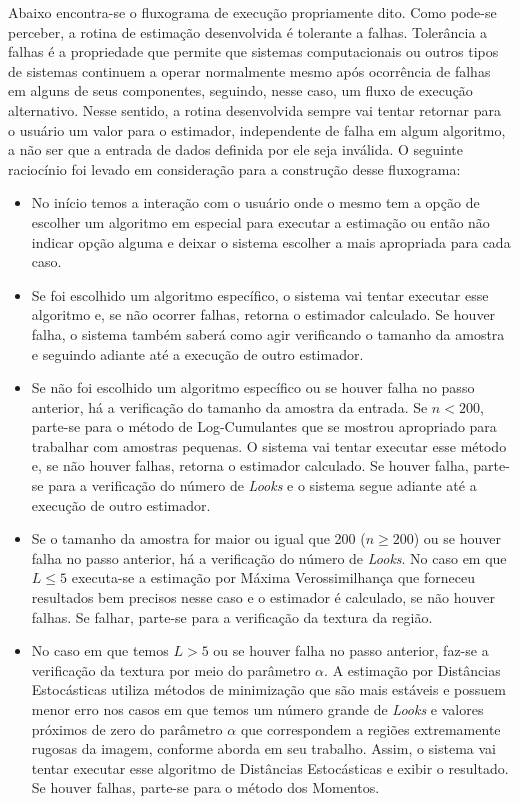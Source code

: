 Abaixo encontra-se o fluxograma de execução propriamente dito. Como pode-se perceber, a rotina de estimação desenvolvida é tolerante a falhas. Tolerância a falhas é a propriedade que permite que sistemas computacionais ou outros tipos de sistemas continuem a operar normalmente mesmo após ocorrência de falhas em alguns de seus componentes, seguindo, nesse caso, um fluxo de execução alternativo. Nesse sentido, a rotina desenvolvida sempre vai tentar retornar para o usuário um valor para o estimador, independente de falha em algum algoritmo, a não ser que a entrada de dados definida por ele seja inválida. O seguinte raciocínio foi levado em consideração para a construção desse fluxograma:
\begin{itemize}
    \item No início temos a interação com o usuário onde o mesmo tem a opção de escolher um algoritmo em especial para executar a estimação ou então não indicar opção alguma e deixar o sistema escolher a mais apropriada para cada caso.
    \item Se foi escolhido um algoritmo específico, o sistema vai tentar executar esse algoritmo e, se não ocorrer falhas, retorna o estimador calculado. Se houver falha, o sistema também saberá como agir verificando o tamanho da amostra e seguindo adiante até a execução de outro estimador.
    \item Se não foi escolhido um algoritmo específico ou se houver falha no passo anterior, há a verificação do tamanho da amostra da entrada. Se $n < 200$, parte-se para o método de Log-Cumulantes que se mostrou apropriado para trabalhar com amostras pequenas. O sistema vai tentar executar esse método e, se não houver falhas, retorna o estimador calculado. Se houver falha, parte-se para a verificação do número de \textit{Looks} e o sistema segue adiante até a execução de outro estimador.
    \item Se o tamanho da amostra for maior ou igual que 200 ($n \geq 200$) ou se houver falha no passo anterior, há a verificação do número de \textit{Looks}. No caso em que $L \leq 5$ executa-se a estimação por Máxima Verossimilhança que forneceu resultados bem precisos nesse caso e o estimador é calculado, se não houver falhas. Se falhar, parte-se para a verificação da textura da região.
    \item No caso em que temos $L > 5$ ou se houver falha no passo anterior, faz-se a verificação da textura por meio do parâmetro $\alpha$. A estimação por Distâncias Estocásticas utiliza métodos de minimização que são mais estáveis e possuem menor erro nos casos em que temos um número grande de \textit{Looks} e valores próximos de zero do parâmetro $\alpha$ que correspondem a regiões extremamente rugosas da imagem, conforme aborda \citet{Cassetti2013} em seu trabalho. Assim, o sistema vai tentar executar esse algoritmo de Distâncias Estocásticas e exibir o resultado. Se houver falhas, parte-se para o método dos Momentos. 

\end{itemize}
